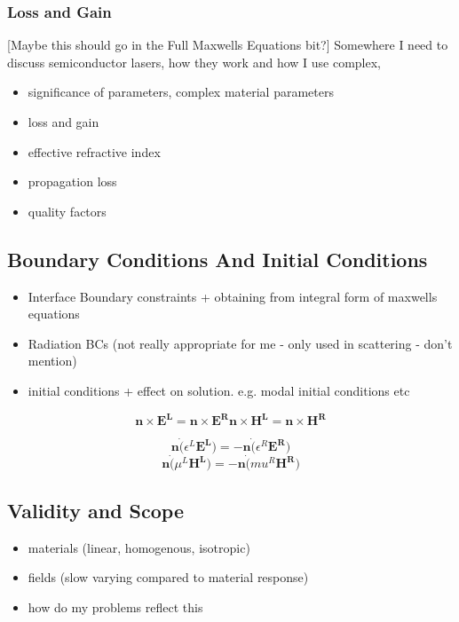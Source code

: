 \subsubsection{Loss and Gain}
[Maybe this should go in the Full Maxwells Equations bit?] Somewhere I need to discuss semiconductor lasers, how they work and how I use complex,
\begin{itemize}
	\item significance of parameters, complex material parameters
	\item loss and gain
	\item effective refractive index
	\item propagation loss
	\item quality factors
\end{itemize}
\subsection{Boundary Conditions And Initial Conditions}
\begin{itemize}
	\item Interface Boundary constraints + obtaining from integral form of maxwells equations
	\item Radiation BCs (not really appropriate for me - only used in scattering - don't mention)
	\item initial conditions + effect on solution. e.g. modal initial conditions etc
\end{itemize}

$$
\mathbf{n} \times \mathbf{E^L} = \mathbf{n} \times \mathbf{E^R} 
\mathbf{n} \times \mathbf{H^L} = \mathbf{n} \times \mathbf{H^R} 
$$

$$
\mathbf{n} \dot ( \epsilon^L \mathbf{E^L} ) = - \mathbf{n} \dot ( \epsilon^R \mathbf{E^R} )
$$
$$
\mathbf{n} \dot ( \mu^L \mathbf{H^L} ) = - \mathbf{n} \dot ( mu^R \mathbf{H^R} )
$$


\subsection{Validity and Scope}
\begin{itemize}
  \item materials (linear, homogenous, isotropic)
	\item fields (slow varying compared to material response)
	\item how do my problems reflect this
\end{itemize}
